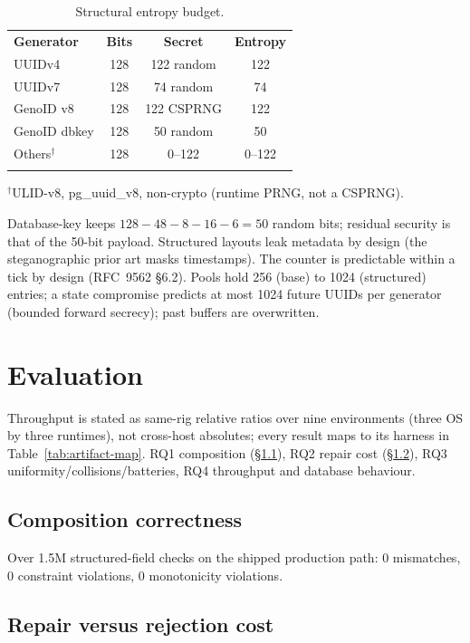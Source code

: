 \documentclass{svproc}
\begin{document}
\begin{table}[t]
\caption{Structural entropy budget.}
\label{tab:min-entropy}
\centering\scriptsize\setlength{\tabcolsep}{3pt}
\begin{tabular}{lccc}
\hline\noalign{\smallskip}
\textbf{Generator} & \textbf{Bits} & \textbf{Secret} & \textbf{Entropy} \\
\noalign{\smallskip}\hline\noalign{\smallskip}
UUIDv4 & 128 & 122 random & 122 \\
UUIDv7 & 128 & 74 random & 74 \\
GenoID v8 & 128 & 122 CSPRNG & 122 \\
GenoID dbkey & 128 & 50 random & 50 \\
Others$^\dagger$ & 128 & 0--122 & 0--122 \\
\noalign{\smallskip}\hline
\end{tabular}
\smallskip
\scriptsize $^\dagger$ULID-v8, pg\_uuid\_v8, non-crypto (runtime PRNG, not a CSPRNG).
\end{table}

Database-key keeps $128-48-8-16-6=50$ random bits; residual security is that of the 50-bit payload. Structured layouts leak metadata by design (the steganographic prior art masks timestamps). The counter is predictable within a tick by design (RFC~9562 \S6.2). Pools hold 256 (base) to 1024 (structured) entries; a state compromise predicts at most 1024 future UUIDs per generator (bounded forward secrecy); past buffers are overwritten. 


\section{Evaluation}
\label{sec:evaluation}
Throughput is stated as same-rig relative ratios over nine environments (three OS by three runtimes), not cross-host absolutes; every result maps to its harness in Table~\ref{tab:artifact-map}. RQ1 composition (\S\ref{sec:composition-correctness}), RQ2 repair cost (\S\ref{sec:repair-vs-rejection}), RQ3 uniformity/collisions/batteries, RQ4 throughput and database behaviour.

\subsection{Composition correctness}
\label{sec:composition-correctness}
Over 1.5M structured-field checks on the shipped production path: 0 mismatches, 0 constraint violations, 0 monotonicity violations.

\subsection{Repair versus rejection cost}
\label{sec:repair-vs-rejection}
\end{document}
